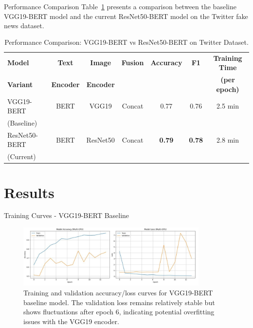 \documentclass[xcolor=dvipsnames,aspectratio=169]{beamer}
\begin{document}
\begin{frame}{Performance Comparison}
Table~\ref{tab:model_comparison} presents a comparison between the baseline VGG19-BERT model and the current ResNet50-BERT model on the Twitter fake news dataset.

\begin{table}[!ht]
    \caption{Performance Comparison: VGG19-BERT vs ResNet50-BERT on Twitter Dataset.}
    \centering
    \small
    \begin{tabular}{|l|c|c|c|c|c|c|}
        \hline
        \textbf{Model} & \textbf{Text} & \textbf{Image} & \textbf{Fusion} & \textbf{Accuracy} & \textbf{F1} & \textbf{Training Time} \\
        \textbf{Variant} & \textbf{Encoder} & \textbf{Encoder} & & & & \textbf{(per epoch)} \\
        \hline
        VGG19-BERT & BERT & VGG19 & Concat & 0.77 & 0.76 & 2.5 min \\
        (Baseline) & & & & & & \\
        \hline
        ResNet50-BERT & BERT & ResNet50 & Concat & \textbf{0.79} & \textbf{0.78} & 2.8 min \\
        (Current) & & & & & & \\
        \hline
    \end{tabular}
    \label{tab:model_comparison}
\end{table}
\end{frame}

\section{Results}

\begin{frame}{Training Curves - VGG19-BERT Baseline}
\begin{figure}
    \centering
    \includegraphics[width=0.85\textwidth]{vgg19_graph.png}
    \caption{Training and validation accuracy/loss curves for VGG19-BERT baseline model. The validation loss remains relatively stable but shows fluctuations after epoch 6, indicating potential overfitting issues with the VGG19 encoder.}
    \label{fig:vgg19_training}
\end{figure}
\end{frame}
\end{document}
